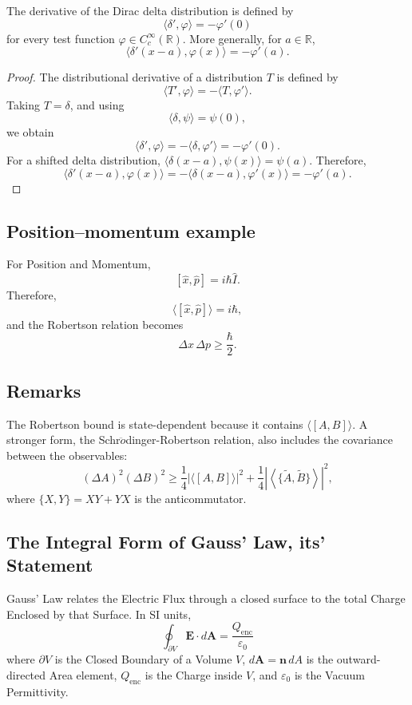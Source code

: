 \documentclass[a4paper, 10pt, onepage]{elegantbook}
\begin{document}
\begin{theorem}
The derivative of the Dirac delta distribution is defined by
\[
\langle \delta',\varphi\rangle=-\varphi'(0)
\]
for every test function \(\varphi\in C_c^\infty(\mathbb{R})\).
More generally, for \(a\in\mathbb{R}\),
\[
\langle \delta'(x-a),\varphi(x)\rangle=-\varphi'(a).
\]
\end{theorem}

\begin{proof}
The distributional derivative of a distribution \(T\) is defined by
\[
\langle T',\varphi\rangle=-\langle T,\varphi'\rangle.
\]
Taking \(T=\delta\), and using
\[
\langle \delta,\psi\rangle=\psi(0),
\]
we obtain
\[
\langle \delta',\varphi\rangle
=-\langle \delta,\varphi'\rangle
=-\varphi'(0).
\]
For a shifted delta distribution, \(\langle \delta(x-a),\psi(x)\rangle
=\psi(a)\). Therefore,
\[
\langle \delta'(x-a),\varphi(x)\rangle
=-\langle \delta(x-a),\varphi'(x)\rangle
=-\varphi'(a).
\]
\end{proof}



\subsection{Position--momentum example}

For Position and Momentum,
\[
[\hat{x},\hat{p}]=i\hbar\hat{I}.
\]
Therefore,
\[
\langle[\hat{x},\hat{p}]\rangle=i\hbar,
\]
and the Robertson relation becomes
\[
\boxed{\Delta x\,\Delta p\geq\frac{\hbar}{2}}.
\]

\subsection{Remarks}

The Robertson bound is state-dependent because it contains
\(\langle[A,B]\rangle\). A stronger form, the
Schr$\ddot{o}$dinger-Robertson relation, also includes the covariance between the observables:
\[
(\Delta A)^2(\Delta B)^2
\geq
\frac{1}{4}\left|\langle[A,B]\rangle\right|^2
+
\frac{1}{4}\left|\left\langle
\{\widetilde{A},\widetilde{B}\}
\right\rangle\right|^2,
\]
where \(\{X,Y\}=XY+YX\) is the anticommutator.

\subsection{The Integral Form of Gauss' Law, its' Statement}

Gauss' Law relates the Electric Flux through a closed surface to the
total Charge Enclosed by that Surface. In SI units,
\[
\boxed{
\oint_{\partial V}\mathbf{E}\cdot d\mathbf{A}
=\frac{Q_{\mathrm{enc}}}{\varepsilon_0}
}
\]
where \(\partial V\) is the Closed Boundary of a Volume \(V\),
\(d\mathbf{A}= \mathbf{n}\,dA\) is the outward-directed Area element,
\(Q_{\mathrm{enc}}\) is the Charge inside \(V\), and
\(\varepsilon_0\) is the Vacuum Permittivity.
\end{document}
